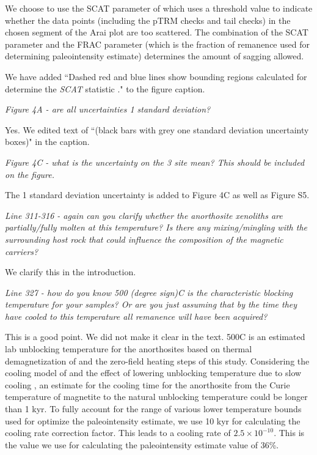 \documentclass[11pt, letterpaper]{article}
\begin{document}
\begin{flushleft}
We choose to use the SCAT parameter of \cite{Tauxe2004a} which uses a threshold value to indicate whether the data points (including the pTRM checks and tail checks) in the chosen segment of the Arai plot are too scattered. The combination of the SCAT parameter and the FRAC parameter (which is the fraction of remanence used for determining paleointensity estimate) determines the amount of sagging allowed.

We have added ``Dashed red and blue lines show bounding regions calculated for determine the \textit{SCAT} statistic \cite{Shaar2013a}." to the figure caption.

\textit{Figure 4A - are all uncertainties 1 standard deviation?}

Yes. We edited text of ``(black bars with grey one standard deviation uncertainty boxes)" in the caption.

\textit{Figure 4C - what is the uncertainty on the 3 site mean? This should be included on the figure.}

The 1 standard deviation uncertainty is added to Figure 4C as well as Figure S5.

\textit{Line 311-316 - again can you clarify whether the anorthosite xenoliths are partially/fully molten at this temperature? Is there any mixing/mingling with the surrounding host rock that could influence the composition of the magnetic carriers?}

We clarify this in the introduction.  

\textit{Line 327 - how do you know 500 (degree sign)C is the characteristic blocking temperature for your samples? Or are you just assuming that by the time they have cooled to this temperature all remanence will have been acquired?}

This is a good point. We did not make it clear in the text. 500\textdegree C is an estimated lab unblocking temperature for the anorthosites based on thermal demagnetization of \cite{Zhang2021b} and the zero-field heating steps of this study. Considering the cooling model of \cite{Zhang2021a} and the effect of lowering unblocking temperature due to slow cooling \cite{Pullaiah1975a}, an estimate for the cooling time for the anorthosite from the Curie temperature of magnetite to the natural unblocking temperature could be longer than 1 kyr. To fully account for the range of various lower temperature bounds used for optimize the paleointensity estimate, we use 10 kyr for calculating the cooling rate correction factor. This leads to a cooling rate of $2.5\times10^{-10}$. This is the value we use for calculating the paleointensity estimate value of 36\%. 


\end{flushleft}
\end{document}
